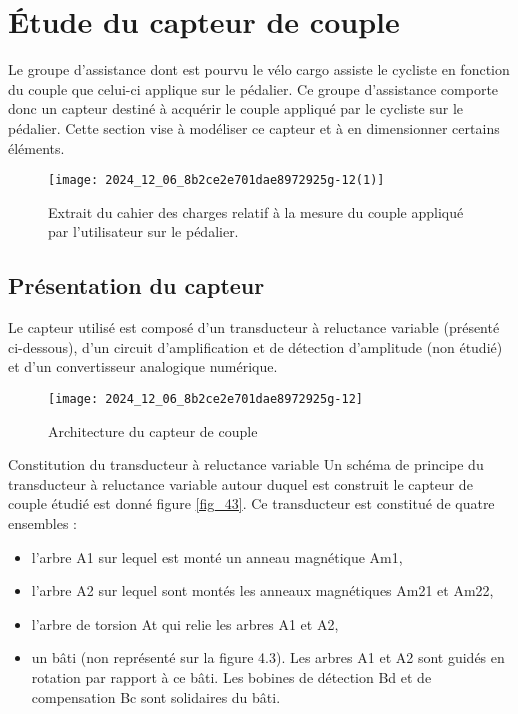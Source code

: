 

\section{Étude du capteur de couple}

Le groupe d'assistance dont est pourvu le vélo cargo assiste le cycliste en fonction du couple que celui-ci applique sur le pédalier. Ce groupe d'assistance comporte donc un capteur destiné à acquérir le couple appliqué par le cycliste sur le pédalier. Cette section vise à modéliser ce capteur et à en dimensionner certains éléments.\\

\begin{figure}[!htb]
\begin{center}
\texttt{[image: 2024\_12\_06\_8b2ce2e701dae8972925g-12(1)]}
\caption{Extrait du cahier des charges relatif à la mesure du couple appliqué par l'utilisateur sur le pédalier. \label{fig_41}}
\end{center}
\end{figure}

\subsection{Présentation du capteur}
Le capteur utilisé est composé d'un transducteur à reluctance variable (présenté ci-dessous), d'un circuit d'amplification et de détection d'amplitude (non étudié) et d'un convertisseur analogique numérique.

\begin{figure}[!htb]
\begin{center}
\texttt{[image: 2024\_12\_06\_8b2ce2e701dae8972925g-12]}
\caption{Architecture du capteur de couple \label{fig_42}}
\end{center}
\end{figure}

Constitution du transducteur à reluctance variable Un schéma de principe du transducteur à reluctance variable autour duquel est construit le capteur de couple étudié est donné figure \ref{fig_43}. Ce transducteur est constitué de quatre ensembles :

\begin{itemize}
  \item l'arbre A1 sur lequel est monté un anneau magnétique Am1,
  \item l'arbre A2 sur lequel sont montés les anneaux magnétiques Am21 et Am22,
  \item l'arbre de torsion At qui relie les arbres A1 et A2,
  \item un bâti (non représenté sur la figure 4.3). Les arbres A1 et A2 sont guidés en rotation par rapport à ce bâti. Les bobines de détection Bd et de compensation Bc sont solidaires du bâti.
\end{itemize}

